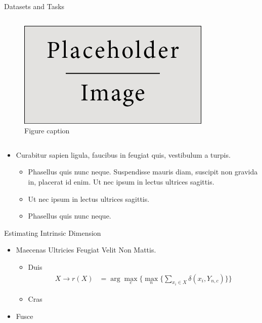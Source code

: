 \documentclass[final,hyperref={pdfpagelabels=false}]{beamer}
\begin{document}
\begin{frame}[t]
\begin{columns}[t]
\begin{column}{.3\textwidth}
\begin{block}{Datasets and Tasks}
\begin{columns}
\begin{column}{.43\textwidth} %
\centering
\begin{figure}
\includegraphics[width=0.8\linewidth]{placeholder.jpg}
\caption{Figure caption}
\end{figure}
\end{column}
\end{columns} %

\begin{itemize}
\item Curabitur sapien ligula, faucibus in feugiat quis, vestibulum a turpis.
\begin{itemize}
\item Phasellus quis nunc neque. Suspendisse mauris diam, suscipit non gravida in, placerat id enim. Ut nec ipsum in lectus ultrices sagittis.
\item Ut nec ipsum in lectus ultrices sagittis.
\item Phasellus quis nunc neque.
\end{itemize}
\end{itemize}

\end{block}

\begin{block}{}

\end{block}

\begin{block}{Estimating Intrinsic Dimension}

\begin{itemize}
\item Maecenas Ultricies Feugiat Velit Non Mattis.
\begin{itemize}
\item Duis
\begin{align*}
X \rightarrow r(X) & = \arg \max_{c} \Big\{ \max_n \big\{ \sum_{x_i \in X} \delta(x_i,Y_{n,c})\big\} \Big\} 
\end{align*}
\item Cras
\end{itemize}
\item Fusce
\end{itemize}


\end{block}
\end{column}
\end{columns}
\end{frame}
\end{document}
